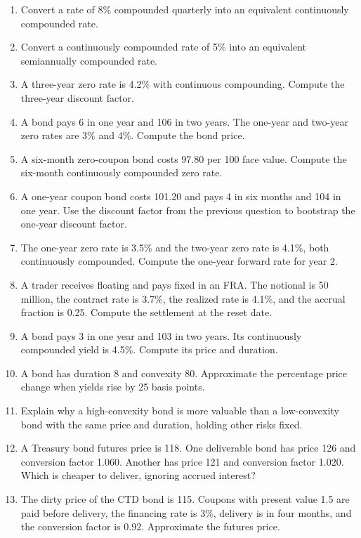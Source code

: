 \begin{enumerate}
    \item Convert a rate of 8\% compounded quarterly into an equivalent
    continuously compounded rate.
    \item Convert a continuously compounded rate of 5\% into an equivalent
    semiannually compounded rate.
    \item A three-year zero rate is 4.2\% with continuous compounding. Compute
    the three-year discount factor.
    \item A bond pays 6 in one year and 106 in two years. The one-year and
    two-year zero rates are 3\% and 4\%. Compute the bond price.
    \item A six-month zero-coupon bond costs 97.80 per 100 face value. Compute
    the six-month continuously compounded zero rate.
    \item A one-year coupon bond costs 101.20 and pays 4 in six months and 104
    in one year. Use the discount factor from the previous question to bootstrap
    the one-year discount factor.
    \item The one-year zero rate is 3.5\% and the two-year zero rate is 4.1\%,
    both continuously compounded. Compute the one-year forward rate for year 2.
    \item A trader receives floating and pays fixed in an FRA. The notional is
    50 million, the contract rate is 3.7\%, the realized rate is 4.1\%, and the
    accrual fraction is 0.25. Compute the settlement at the reset date.
    \item A bond pays 3 in one year and 103 in two years. Its continuously
    compounded yield is 4.5\%. Compute its price and duration.
    \item A bond has duration 8 and convexity 80. Approximate the percentage
    price change when yields rise by 25 basis points.
    \item Explain why a high-convexity bond is more valuable than a low-convexity
    bond with the same price and duration, holding other risks fixed.
    \item A Treasury bond futures price is 118. One deliverable bond has price
    126 and conversion factor 1.060. Another has price 121 and conversion
    factor 1.020. Which is cheaper to deliver, ignoring accrued interest?
    \item The dirty price of the CTD bond is 115. Coupons with present value 1.5
    are paid before delivery, the financing rate is 3\%, delivery is in four
    months, and the conversion factor is 0.92. Approximate the futures price.

\end{enumerate}
